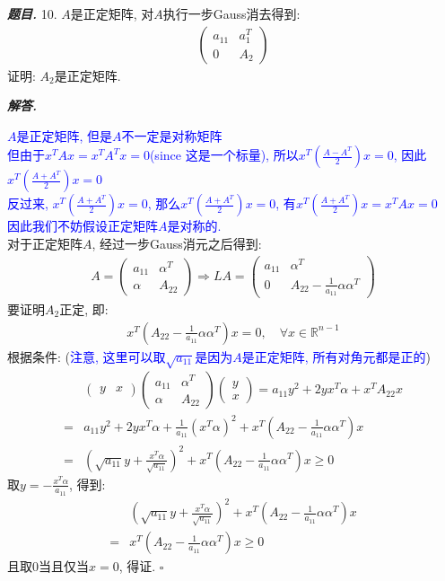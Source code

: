 \documentclass[10pt, a4paper, oneside]{ctexart}
\newenvironment{problem}{\begin{framed}\par\noindent\textbf{\textit{题目. }}}{\end{framed}\par}
\newenvironment{solution}{%
  \par\noindent\textbf{\textit{解答. }}\ignorespaces
}{%
  \hfill\ensuremath{\square}\par %
}
\begin{document}
\begin{problem}
10. $A$是正定矩阵, 对$A$执行一步Gauss消去得到:
\begin{align*}
    \begin{pmatrix}
        a_{11}& a_1^T \\ 0 &A_2
    \end{pmatrix}
\end{align*}
证明: $A_2$是正定矩阵.
\end{problem}
\begin{solution}
\textcolor{blue}{$A$是正定矩阵, 但是$A$不一定是对称矩阵\\但由于$x^TAx = x^TA^Tx=0$(since 这是一个标量), 所以$x^T(\frac{A-A^T}{2})x=0$, 因此$x^T(\frac{A+A^T}{2})x=0$\\ 反过来, $x^T(\frac{A+A^T}{2})x=0$, 那么$x^T(\frac{A+A^T}{2})x=0$, 有$x^T(\frac{A+A^T}{2})x=x^TAx=0$\\ 因此我们不妨假设正定矩阵$A$是对称的.}\\
对于正定矩阵$A$, 经过一步Gauss消元之后得到:
\begin{align*}
    A=\begin{pmatrix}
        a_{11} & \alpha^T \\ \alpha & A_{22} 
    \end{pmatrix} \Rightarrow LA = \begin{pmatrix}
        a_{11}&\alpha^T \\ 0 & A_{22} - \frac{1}{a_{11}}\alpha \alpha^T
    \end{pmatrix}
\end{align*}
要证明$A_2$正定, 即:
\begin{align*}
    x^T(A_{22} - \frac{1}{a_{11}}\alpha \alpha^T)x=0,\quad \forall x\in \mathbb{R}^{n-1}
\end{align*}     
根据条件: (\textcolor{blue}{注意, 这里可以取$\sqrt{a_{11}}$是因为$A$是正定矩阵, 所有对角元都是正的})
\begin{align*}
    &\begin{pmatrix}
        y&x
    \end{pmatrix} \begin{pmatrix}
        a_{11} & \alpha^T \\ \alpha & A_{22} 
    \end{pmatrix} \begin{pmatrix}
        y\\x
    \end{pmatrix}=a_{11}y^2+ 2yx^T\alpha +x^TA_{22}x\\
    =& a_{11}y^2+ 2yx^T\alpha + \frac{1}{a_{11}}(x^T\alpha )^2 +x^T(A_{22} - \frac{1}{a_{11}}\alpha \alpha^T)x\\
    =& (\sqrt{a_{11}}y + \frac{x^T\alpha}{\sqrt{a_{11}}})^2 + x^T(A_{22} - \frac{1}{a_{11}}\alpha \alpha^T)x \geq 0
\end{align*}
取$y = - \frac{x^T\alpha}{a_{11}}$, 得到:
\begin{align*}
    &(\sqrt{a_{11}}y + \frac{x^T\alpha}{\sqrt{a_{11}}})^2 + x^T(A_{22} - \frac{1}{a_{11}}\alpha \alpha^T)x\\
    =&x^T(A_{22} - \frac{1}{a_{11}}\alpha \alpha^T)x\geq 0
\end{align*}
且取$0$当且仅当$x=0$, 得证.
\end{solution}
\end{document}
